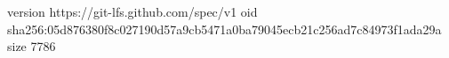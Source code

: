 version https://git-lfs.github.com/spec/v1
oid sha256:05d876380f8c027190d57a9cb5471a0ba79045ecb21c256ad7c84973f1ada29a
size 7786
